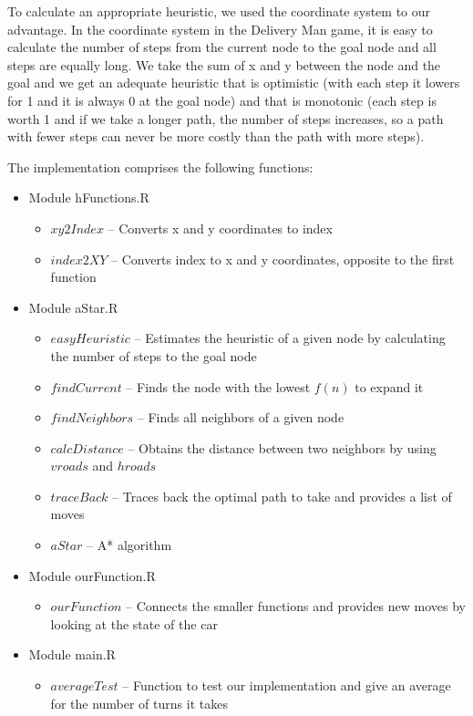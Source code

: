 \documentclass[a4paper]{article}
\begin{document}
To calculate an appropriate heuristic, we used the coordinate system to our advantage. In the coordinate system in the Delivery Man game, it is easy to calculate the number of steps from the current node to the goal node and all steps are equally long. We take the sum of x and y between the node and the goal and we get an adequate heuristic that is optimistic (with each step it lowers for 1 and it is always 0 at the goal node) and that is monotonic (each step is worth 1 and if we take a longer path, the number of steps increases, so a path with fewer steps can never be more costly than the path with more steps).

\vskip0.5cm

The implementation comprises the following functions:
\begin{itemize}
\item Module hFunctions.R
\begin{itemize}
  \item $xy2Index$ -- Converts x and y coordinates to index
  \item $index2XY$ -- Converts index to x and y coordinates, opposite to the first function
\end{itemize}
\item Module aStar.R
\begin{itemize}
  \item $easyHeuristic$ -- Estimates the heuristic of a given node by calculating the number of steps to the goal node
  \item $findCurrent$ -- Finds the node with the lowest $f(n)$ to expand it
  \item $findNeighbors$ -- Finds all neighbors of a given node
  \item $calcDistance$ -- Obtains the distance between two neighbors by using $vroads$ and $hroads$
  \item $traceBack$ -- Traces back the optimal path to take and provides a list of moves
  \item $aStar$ -- A* algorithm
\end{itemize}
\item Module ourFunction.R
\begin{itemize}
	\item $ourFunction$ -- Connects the smaller functions and provides new moves by looking at the state of the car 
\end{itemize}
\item Module main.R
\begin{itemize}
\item $averageTest$ -- Function to test our implementation and give an average for the number of turns it takes
\end{itemize}

\end{itemize}
\end{document}
